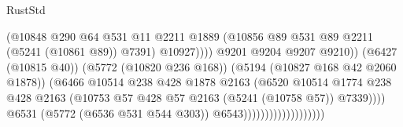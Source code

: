\begin{lexlean}{RustStd}
\begin{coremodule}
{\begin{coremodule}
{{{{{{{{{{{{{{{{{{{{{{{{{{{{{                                                      (@10848
                                                        @290
                                                        @64
                                                        @531
                                                        @11
                                                        @2211
                                                        @1889
                                                        (@10856
                                                          @89
                                                          @531
                                                          @89
                                                          @2211
                                                          (@5241 (@10861 @89))
                                                          @7391)
                                                        @10927))))
                                                @9201
                                                @9204
                                                @9207
                                                @9210))
                                            (@6427 (@10815 @40))
                                            (@5772 (@10820 @236 @168))
                                            (@5194 (@10827 @168 @42 @2060 @1878))
                                            (@6466
                                              @10514
                                              @238
                                              @428
                                              @1878
                                              @2163
                                              (@6520
                                                @10514
                                                @1774
                                                @238
                                                @428
                                                @2163
                                                (@10753
                                                  @57
                                                  @428
                                                  @57
                                                  @2163
                                                  (@5241 (@10758 @57))
                                                  @7339))))
                                          @6531
                                          (@5772 (@6536 @531 @544 @303))
                                          @6543)))))))))))))))))))
}}}}}}}}}}}}}}}}}}}}}}}}}}}}}
\end{coremodule}}
\end{coremodule}
\end{lexlean}
